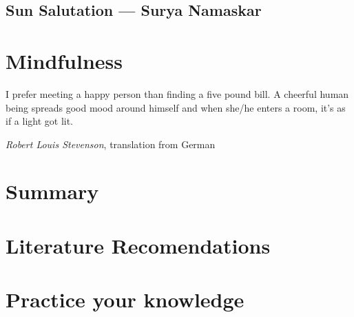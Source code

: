 \documentclass[../main.tex]{subfiles}
\begin{document}
\section{Sun Salutation ---  Surya Namaskar}

\chapter{Mindfulness}

\newpage

\epigraph{I prefer meeting a happy person than finding a five pound bill. A cheerful human being spreads good mood around himself and when she/he enters a room, it's as if a light got lit.}{\textit{Robert Louis Stevenson}, translation from German}



\chapter{Summary}

\chapter{Literature Recomendations}


\chapter{Practice your knowledge}

\end{document}
